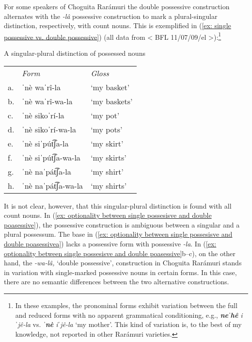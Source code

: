 For some speakers of Choguita Rarámuri the double possessive construction alternates with the \textit{{}-lâ} possessive construction to mark a plural-singular distinction, respectively, with count nouns. This is exemplified in (\ref{ex: single possessive vs. double possessive}) (all data from < BFL 11/07/09/el >):\footnote{In these examples, the pronominal forms exhibit variation between the full and reduced forms with no apparent grammatical conditioning, e.g., \textit{\textbf{neˈhê} iˈjê-la}  vs. \textit{\textbf{ˈnè} iˈjê-la}  `my mother'. This kind of variation is, to the best of my knowledge, not reported in other Rarámuri varieties.}


\ea\label{ex: single possessive vs. double possessive}
{A singular-plural distinction of possessed nouns}

\begin{tabular}{lll}
    & \textit{Form} & \textit{Gloss} \\
     a.& ˈnè waˈrî-la  & `my basket'\\
     b.& ˈnè waˈrî-wa-la  &  `my baskets'\\
     c.& ˈnè sikoˈrí-la &  `my pot' \\
     d.& ˈnè sikoˈrí-wa-la & `my pots'\\
     e.& ˈnè siˈpút͡ʃa-la & `my skirt'\\
     f.& ˈnè siˈpút͡ʃa-wa-la & `my skirts'\\
     g.& ˈnè naˈpát͡ʃa-la & `my shirt'\\
     h.& ˈnè naˈpát͡ʃa-wa-la & `my shirts'\\
\end{tabular}
    \z

It is not clear, however, that this singular-plural distinction is found with all count nouns. In (\ref{ex: optionality between single possesisve and double poasessive}), the possessive construction is ambiguous between a singular and a plural possessum. The base in (\ref{ex: optionality between single possesisve and double poasessivea}) lacks a possessive form with possessive \textit{-la}. In (\ref{ex: optionality between single possesisve and double poasessive}b--c), on the other hand, the \textit{-wa-lâ,} ‘double possessive’, construction in Choguita Rarámuri stands in variation with single-marked possessive nouns in certain forms. In this case, there are no semantic differences between the two alternative constructions.

